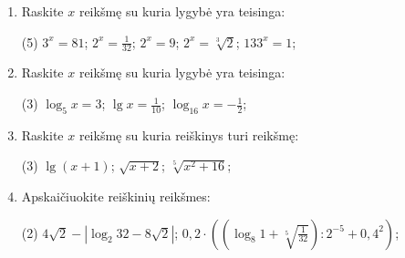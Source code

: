 \documentclass[a4paper]{article}
\begin{document}
\clearpage
\thispagestyle{empty} 
\begin{enumerate}
      \item Raskite $x$ reikšmę su kuria lygybė yra teisinga:
    
      \begin{tasks}[item-format={\normalfont}, after-item-skip=4mm](5)
            \task $3^{x}=81$;
            \task $2^{x}=\frac{1}{32}$;
            \task $2^{x}=9$;
            \task $2^{x}=\sqrt[3]{2}$;
            \task $133^{x}=1$;
      \end{tasks}

      \item Raskite $x$  reikšmę su kuria lygybė yra teisinga:
      \begin{tasks}[item-format={\normalfont}, after-item-skip=4mm](3)
            \task $\log_{5} x=3$;
            \task $\lg x=\frac{1}{10}$;
            \task $\log_{16} x=-\frac{1}{2}$;
      \end{tasks}
      
      \item Raskite $x$  reikšmę su kuria reiškinys turi reikšmę:
      \begin{tasks}[item-format={\normalfont}, after-item-skip=4mm](3)
            \task $\lg (x+1)$;
            \task $\sqrt{x+2}$;
            \task $\sqrt[5]{x^{2}+16}$;
      \end{tasks}

      \item Apskaičiuokite reiškinių reikšmes:
      \begin{tasks}[item-format={\normalfont}, after-item-skip=10mm](2)
            \task $4\sqrt{2}-\left|\log_{2}32-8\sqrt{2}\right|$;
            \task $0,2 \cdot ((\log_{8}1+\sqrt[5]{\frac{1}{32}}):2^{-5}+0,4^2)$;
      \end{tasks}
\end{enumerate} 
\end{document}
